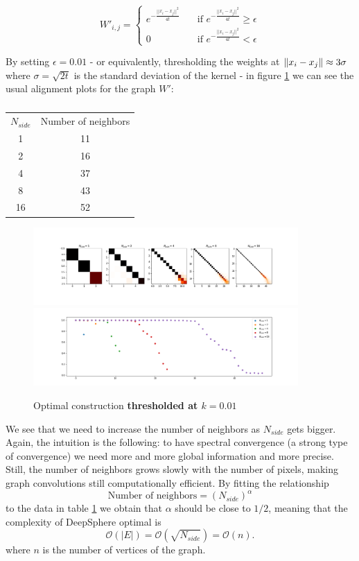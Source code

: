 $$W'_{i,j} = \begin{cases}
e^{-\frac{||x_i-x_j||^2}{4t}}\quad& \text{if } e^{-\frac{||x_i-x_j||^2}{4t}} \geq \epsilon\\
0 \quad & \text{if } e^{-\frac{||x_i-x_j||^2}{4t}} < \epsilon
\end{cases}$$

By setting $\epsilon = 0.01$ - or equivalently, thresholding the weights at $\left\lVert x_i-x_j\right\rVert\approx 3\sigma$ where $\sigma=\sqrt{2t}$ is the standard deviation of the kernel - in figure \ref{fig:optimal_thresholded} we can see the usual alignment plots for the graph $W'$:

\begin{table}[h]
	\centering
	\begin{tabular}{ c|c} 
		$N_{side}$ & Number of neighbors \\ 
		1 & 11 \\ 
		2 & 16 \\ 
		4 & 37 \\ 
		8 & 43 \\ 
		16 & 52 \\ 
	\end{tabular}
\caption{\label{table:NN}}
\end{table}

\begin{figure}[h]
	\centering
	\includegraphics[width=0.9\textwidth]{../codes/02.HeatKernelGraphLaplacian/HEALPix/06_figures/optimal_thresholded.png}	
	\includegraphics[width=0.9\textwidth]{../codes/02.HeatKernelGraphLaplacian/HEALPix/06_figures/optimal_thresholded_diagonal.png}
	\caption{\label{fig:optimal_thresholded}Optimal construction \textbf{thresholded at $k=0.01$}}
\end{figure}

We see that we need to increase the number of neighbors as $N_{side}$ gets bigger. Again, the intuition is the following: to have spectral convergence (a strong type of convergence) we need more and more global information and more precise.  Still, the number of neighbors grows slowly with the number of pixels, making graph convolutions still computationally efficient. By fitting the relationship
$$
\text{Number of neighbors} = (N_{side})^\alpha
$$
to the data in table \ref{table:NN} we obtain that $\alpha$ should be close to $1/2$, meaning that the complexity of DeepSphere optimal is 
$$
\mathcal O(|E|) = \mathcal O(\sqrt{N_{side}})  = \mathcal{O}(n).
$$
where $n$ is the number of vertices of the graph.

